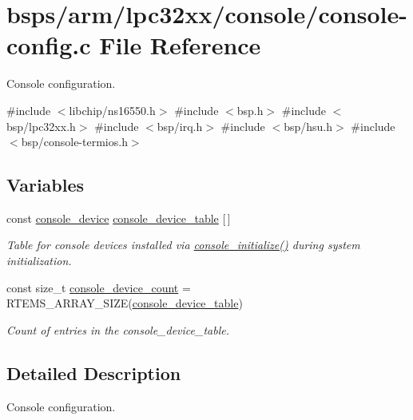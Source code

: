 \hypertarget{arm_2lpc32xx_2console_2console-config_8c}{}\section{bsps/arm/lpc32xx/console/console-\/config.c File Reference}
\label{arm_2lpc32xx_2console_2console-config_8c}


Console configuration.  


{\ttfamily \#include $<$libchip/ns16550.\+h$>$}\newline
{\ttfamily \#include $<$bsp.\+h$>$}\newline
{\ttfamily \#include $<$bsp/lpc32xx.\+h$>$}\newline
{\ttfamily \#include $<$bsp/irq.\+h$>$}\newline
{\ttfamily \#include $<$bsp/hsu.\+h$>$}\newline
{\ttfamily \#include $<$bsp/console-\/termios.\+h$>$}\newline
\subsection*{Variables}
\begin{DoxyCompactItemize}
\item 
const \mbox{\hyperlink{structconsole__device}{console\+\_\+device}} \mbox{\hyperlink{group__ConsoleTermios_ga7f058e756eb724397922b823131fba5c}{console\+\_\+device\+\_\+table}} \mbox{[}$\,$\mbox{]}
\begin{DoxyCompactList}\small\item\em Table for console devices installed via \mbox{\hyperlink{arm_2raspberrypi_2console_2console-config_8c_a4bdc321ef3ab62a261d77b5dbe075566}{console\+\_\+initialize()}} during system initialization. \end{DoxyCompactList}\item 
const size\+\_\+t \mbox{\hyperlink{group__ConsoleTermios_gabca2c9c9873b0482f9fd306e6bade017}{console\+\_\+device\+\_\+count}} = R\+T\+E\+M\+S\+\_\+\+A\+R\+R\+A\+Y\+\_\+\+S\+I\+ZE(\mbox{\hyperlink{group__ConsoleTermios_ga7f058e756eb724397922b823131fba5c}{console\+\_\+device\+\_\+table}})
\begin{DoxyCompactList}\small\item\em Count of entries in the console\+\_\+device\+\_\+table. \end{DoxyCompactList}\end{DoxyCompactItemize}


\subsection{Detailed Description}
Console configuration. 

